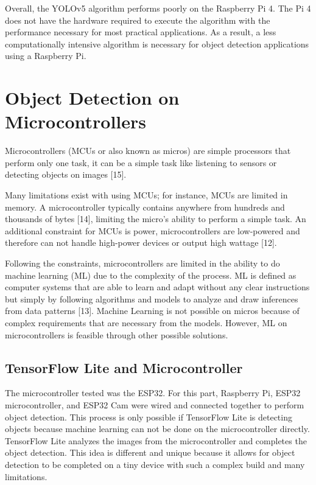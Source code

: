 \documentclass[Report]{IEEEtran}
\begin{document}
Overall, the YOLOv5 algorithm performs poorly on the Raspberry Pi 4. The Pi 4 does not have the hardware required to execute the algorithm with the performance necessary for most practical applications. As a result, a less computationally intensive algorithm is necessary for object detection applications using a Raspberry Pi.

\section{Object Detection on Microcontrollers}
Microcontrollers (MCUs or also known as micros) are simple processors that perform only one task, it can be a simple task like listening to sensors or detecting objects on images [15].

Many limitations exist with using MCUs; for instance, MCUs are limited in memory. A microcontroller typically contains anywhere from hundreds and thousands of bytes [14], limiting the micro's ability to perform a simple task. An additional constraint for MCUs is power, microcontrollers are low-powered and therefore can not handle high-power devices or output high wattage [12]. 

Following the constraints, microcontrollers are limited in the ability to do machine learning (ML) due to the complexity of the process. ML is defined as computer systems that are able to learn and adapt without any clear instructions but simply by following algorithms and models to analyze and draw inferences from data patterns [13]. Machine Learning is not possible on micros because of complex requirements that are necessary from the models. However, ML on microcontrollers is feasible through other possible solutions. 

\subsection{TensorFlow Lite and Microcontroller}
The microcontroller tested was the ESP32. For this part, Raspberry Pi, ESP32 microcontroller, and ESP32 Cam were wired and connected together to perform object detection. This process is only possible if TensorFlow Lite is detecting objects because machine learning can not be done on the microcontroller directly. TensorFlow Lite analyzes the images from the microcontroller and completes the object detection. This idea is different and unique because it allows for object detection to be completed on a tiny device with such a complex build and many limitations. 
\end{document}

